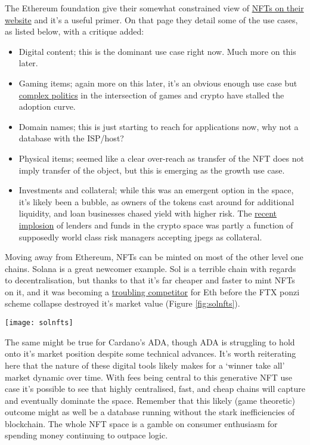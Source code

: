 The Ethereum foundation give their somewhat constrained view of \href{https://ethereum.org/en/nft/}{NFTs on their website} and it's a useful primer. On that page they detail some of the use cases, as listed below, with a critique added:
\begin{itemize}
\item Digital content; this is the dominant use case right now. Much more on this later.
\item Gaming items; again more on this later, it's an obvious enough use case but \href{https://climatereplay.org/nfts/nft-digital-ownership-pledge/}{complex politics} in the intersection of games and crypto have stalled the adoption curve.
\item Domain names; this is just starting to reach for applications now, why not a database with the ISP/host?
\item Physical items; seemed like a clear over-reach as transfer of the NFT does not imply transfer of the object, but this is emerging as the growth use case.
\item Investments and collateral; while this was an emergent option in the space, it's likely been a bubble, as owners of the tokens cast around for additional liquidity, and loan businesses chased yield with higher risk. The \href{https://newsletter.banklesshq.com/p/three-arrows-capital-grayscale-maker-lido}{recent implosion} of lenders and funds in the crypto space was partly a function of supposedly world class risk managers accepting jpegs as collateral.
\end{itemize}
Moving away from Ethereum, NFTs can be minted on most of the other level one chains. Solana is a great newcomer example. Sol is a terrible chain with regards to decentralisation, but thanks to that it's far cheaper and faster to mint NFTs on it, and it was becoming a \href{https://markets.businessinsider.com/news/currencies/ethereum-eth-killers-nfts-defi-solana-cardano-wax-crypto-investing-2022-1}{troubling competitor} for Eth before the FTX ponzi scheme collapse destroyed it's market value (Figure \ref{fig:solnfts}).\par 
\begin{figure*}[ht]\centering %
	\texttt{[image: solnfts]}
	\caption{Solana NFT markets are enjoying growth compared to Opensea on Ethereum, even in the downturn.}
	\label{fig:solnfts}
\end{figure*}
The same might be true for Cardano's ADA, though ADA is struggling to hold onto it's market position despite some technical advances. It's worth reiterating here that the nature of these digital tools likely makes for a `winner take all' market dynamic over time. With fees being central to this generative NFT use case it's possible to see that highly centralised, fast, and cheap chains will capture and eventually dominate the space. Remember that this likely (game theoretic) outcome might as well be a database running without the stark inefficiencies of blockchain. The whole NFT space is a gamble on consumer enthusiasm for spending money continuing to outpace logic.\par 
